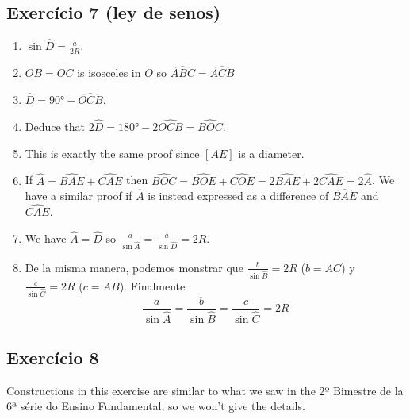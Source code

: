 \subsection{Exercício 7 (ley de senos)}

\begin{enumerate}
\item $\sin \widehat{D} = \frac{a}{2R}$.
\item $OB = OC$ is isosceles in $O$ so $\widehat{ABC} = \widehat{ACB}$
\item $\widehat{D} = 90° - \widehat{OCB}$.
\item Deduce that $2 \widehat{D} = 180° - 2 \widehat{OCB} = \widehat{BOC}$.
\item This is exactly the same proof since $[AE]$ is a diameter.
\item
  If $\widehat{A} = \widehat{BAE} + \widehat{CAE}$
  then $\widehat{BOC} = \widehat{BOE} + \widehat{COE} =
  2\widehat{BAE} + 2\widehat{CAE} = 2\widehat{A}$.
  We have a similar proof if
  $\widehat{A}$ is instead expressed as a difference of
  $\widehat{BAE}$ and $\widehat{CAE}$.
\item
  We have $\widehat{A} = \widehat{D}$ so
  $\frac{a}{\sin \widehat{A}} = \frac{a}{\sin \widehat{D}} = 2R$.
\item De la misma manera, podemos monstrar que
  $\frac{b}{\sin \widehat{B}} = 2R$ ($b = AC$) y
  $\frac{c}{\sin \widehat{C}} = 2R$ ($c = AB$). Finalmente
$$
\frac{a}{\sin \widehat{A}} = \frac{b}{\sin \widehat{B}} =
\frac{c}{\sin \widehat{C}} = 2R
$$

\end{enumerate}

\subsection{Exercício 8}

Constructions in this exercise are similar to what we saw in the 2º Bimestre de
la 6ª série do Ensino Fundamental, so we won't give the details.

